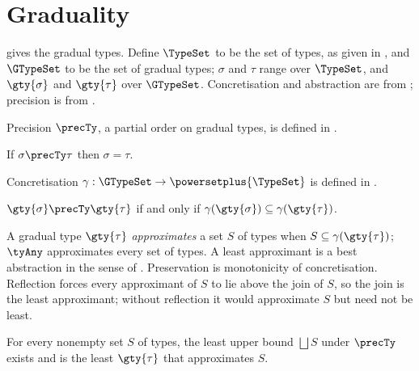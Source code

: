 \section{Graduality}
\label{sec:graduality}

 gives the gradual types. Define $\TypeSet$ to be the set of
types, as given in \specification, and $\GTypeSet$ to be the set
of gradual types; $\sigma$ and $\tau$ range over $\TypeSet$, and $\gty{\sigma}$ and $\gty{\tau}$ over
$\GTypeSet$. Concretisation and abstraction are from \citet{garcia2016}; precision is from
\citet{siek2015}.



\begin{definition}[Precision]
\label{def:precision}
Precision $\precTy$, a partial order on gradual types, is defined in .
\end{definition}

\begin{lemma}
\label{lem:static-discrete}
If $\sigma \precTy \tau$ then $\sigma = \tau$.
\end{lemma}

\begin{definition}[Concretisation]
\label{def:concretisation}
Concretisation $\gamma : \GTypeSet \to \powersetplus{\TypeSet}$ is defined in .
\end{definition}



\begin{lemma}
\label{lem:precision-concretisation}
$\gty{\sigma} \precTy \gty{\tau}$ if and only if $\gamma(\gty{\sigma}) \subseteq \gamma(\gty{\tau})$.
\end{lemma}

A gradual type $\gty{\tau}$ \emph{approximates} a set $S$ of types when $S \subseteq \gamma(\gty{\tau})$;
$\tyAny$ approximates every set of types. A least approximant is a best abstraction in the sense
of \citet{cousot1977}. Preservation is monotonicity of concretisation. Reflection forces every
approximant of $S$ to lie above the join of $S$, so the join is the least approximant; without
reflection it would approximate $S$ but need not be least.

\begin{lemma}
\label{lem:least-approximant}
For every nonempty set $S$ of types, the least upper bound $\bigsqcup S$ under $\precTy$ exists and
is the least $\gty{\tau}$ that approximates $S$.
\end{lemma}

